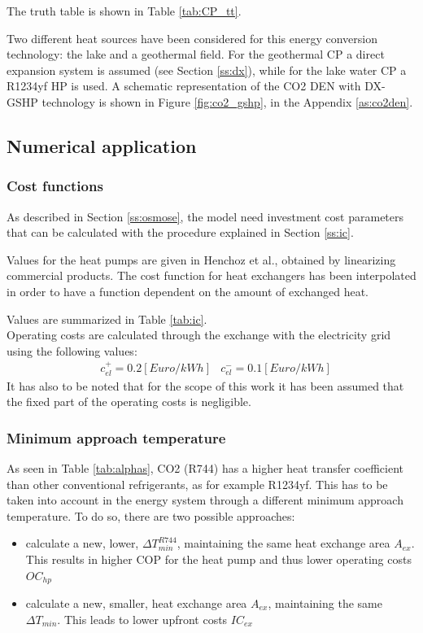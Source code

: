 \documentclass{article}
\begin{document}
The truth table is shown in Table \ref{tab:CP_tt}.


Two different heat sources have been considered for this energy conversion technology: the lake and a geothermal field. For the geothermal CP a direct expansion system is assumed (see Section \ref{ss:dx}), while for the lake water CP a R1234yf HP is used. A schematic representation of the CO2 DEN with DX-GSHP technology is shown in Figure \ref{fig:co2_gshp}, in the Appendix \ref{as:co2den}.

\subsection{Numerical application}

\subsubsection{Cost functions}

As described in Section \ref{ss:osmose}, the model need investment cost parameters that can be calculated with the procedure explained in Section \ref{ss:ic}.

Values for the heat pumps are given in Henchoz et al., obtained by linearizing commercial products\cite{henchozPerformanceProfitabilityPerspectives2015}. The cost function for heat exchangers has been interpolated in order to have a function dependent on the amount of exchanged heat.



Values are summarized in Table \ref{tab:ic}.\\

Operating costs are calculated through the exchange with the electricity grid using the following values:
\begin{align}
	& c_{el}^{+} = 0.2 [Euro/kWh]
	& c_{el}^{-} = 0.1 [Euro/kWh]
\end{align}
It has also to be noted that for the scope of this work it has been assumed that the fixed part of the operating costs is negligible.

\subsubsection{Minimum approach temperature}
As seen in Table \ref{tab:alphas}, CO2 (R744) has a higher heat transfer coefficient than other conventional refrigerants, as for example R1234yf. This has to be taken into account in the energy system through a different minimum approach temperature. To do so, there are two possible approaches:
\begin{itemize}
	\item calculate a new, lower, $\Delta T_{min}^{R744}$, maintaining the same heat exchange area $A_{ex}$. This results in higher COP for the heat pump and thus lower operating costs $OC_{hp}$
	\item calculate a new, smaller, heat exchange area  $A_{ex}$, maintaining the same $\Delta T_{min}$. This leads to lower upfront costs $IC_{ex}$
\end{itemize}
\end{document}
